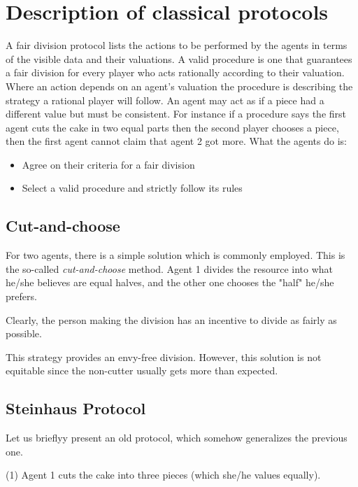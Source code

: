 \section{Description of classical protocols}

A fair division protocol lists the actions to be performed by the agents in terms of the visible data and their valuations. 
A valid procedure is one that guarantees a fair division for every player who acts rationally according to their valuation. 
Where an action depends on an agent's valuation the procedure is describing the strategy a rational player will follow. 
An agent may act as if a piece had a different value but must be consistent. 
For instance if a procedure says the first agent cuts the cake in two equal parts then the second player chooses a piece, 
then the first agent cannot claim that agent 2 got more.
What the agents do is:
\begin{itemize}
\item Agree on their criteria for a fair division
\item Select a valid procedure and strictly follow its rules
\end{itemize}

\subsection{Cut-and-choose}

For two agents, there is a simple solution which is commonly employed. 
This is the so-called \textit{cut-and-choose} method. 
Agent 1 divides the resource into what he/she believes are equal halves, and the other one chooses the "half" he/she prefers. 

Clearly, the person making the division has an incentive to divide as fairly as possible. 

This strategy provides an envy-free division.
However, this solution is not equitable since the non-cutter usually gets more than expected.

\subsection{Steinhaus Protocol}

Let us brieflyy present an old protocol, which somehow generalizes the previous one.

(1) Agent 1 cuts the cake into three pieces (which she/he values equally).

